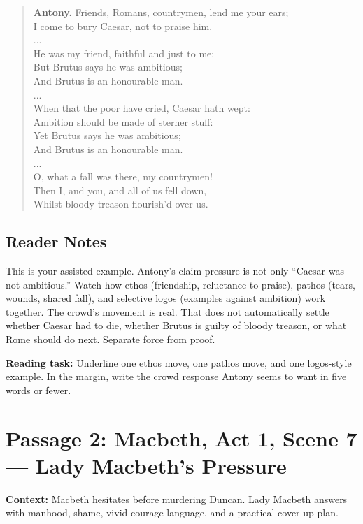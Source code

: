 \documentclass[12pt]{article}
\newenvironment{playpassage}{\begin{quote}\footnotesize\setlength{\parskip}{0.08em}\setlength{\parindent}{0pt}}{\end{quote}}
\newcommand{\speaker}[1]{\textbf{#1.}}
\begin{document}
\begin{playpassage}
\speaker{Antony} Friends, Romans, countrymen, lend me your ears;\\
I come to bury Caesar, not to praise him.\\
...\\
He was my friend, faithful and just to me:\\
But Brutus says he was ambitious;\\
And Brutus is an honourable man.\\
...\\
When that the poor have cried, Caesar hath wept:\\
Ambition should be made of sterner stuff:\\
Yet Brutus says he was ambitious;\\
And Brutus is an honourable man.\\
...\\
O, what a fall was there, my countrymen!\\
Then I, and you, and all of us fell down,\\
Whilst bloody treason flourish'd over us.
\end{playpassage}

\subsection*{Reader Notes}

This is your assisted example. Antony's claim-pressure is not only ``Caesar was not ambitious.'' Watch how ethos (friendship, reluctance to praise), pathos (tears, wounds, shared fall), and selective logos (examples against ambition) work together. The crowd's movement is real. That does not automatically settle whether Caesar had to die, whether Brutus is guilty of bloody treason, or what Rome should do next. Separate force from proof.

\textbf{Reading task:} Underline one ethos move, one pathos move, and one logos-style example. In the margin, write the crowd response Antony seems to want in five words or fewer.

\newpage

\section*{Passage 2: Macbeth, Act 1, Scene 7 --- Lady Macbeth's Pressure}

\textbf{Context:} Macbeth hesitates before murdering Duncan. Lady Macbeth answers with manhood, shame, vivid courage-language, and a practical cover-up plan.
\end{document}

